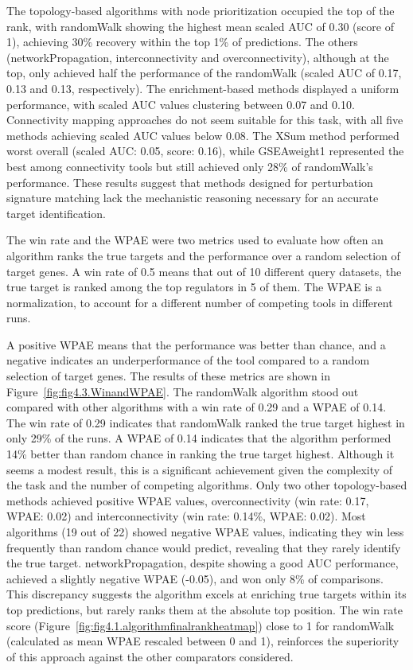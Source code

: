 The topology-based algorithms with node prioritization occupied the top of the rank, with randomWalk showing the highest mean scaled \gls{AUC} of 0.30 (score of 1), achieving 30\% recovery within the top 1\% of predictions.
The others (networkPropagation, interconnectivity and overconnectivity), although at the top, only achieved half the performance of the randomWalk (scaled \gls{AUC} of 0.17, 0.13 and 0.13, respectively).
The enrichment-based methods displayed a uniform performance, with scaled \gls{AUC} values clustering between 0.07 and 0.10.
Connectivity mapping approaches do not seem suitable for this task, with all five methods achieving scaled \gls{AUC} values below 0.08.
The XSum method performed worst overall (scaled \gls{AUC}: 0.05, score: 0.16), while GSEAweight1 represented the best among connectivity tools but still achieved only 28\% of randomWalk's performance.
These results suggest that methods designed for perturbation signature matching lack the mechanistic reasoning necessary for an accurate target identification.

The win rate and the \gls{WPAE} were two metrics used to evaluate how often an algorithm ranks the true targets and the performance over a random selection of target genes.
A win rate of 0.5 means that out of 10 different query datasets, the true target is ranked among the top regulators in 5 of them.
The \gls{WPAE} is a normalization, to account for a different number of competing tools in different runs.

A positive \gls{WPAE} means that the performance was better than chance, and a negative indicates an underperformance of the tool compared to a random selection of target genes.
The results of these metrics are shown in Figure~\ref{fig:fig4.3.WinandWPAE}.
The randomWalk algorithm stood out compared with other algorithms with a win rate of 0.29 and a \gls{WPAE} of 0.14.
The win rate of 0.29 indicates that randomWalk ranked the true target highest in only 29\% of the runs.
A \gls{WPAE} of 0.14 indicates that the algorithm performed 14\% better than random chance in ranking the true target highest.
Although it seems a modest result, this is a significant achievement given the complexity of the task and the number of competing algorithms.
Only two other topology-based methods achieved positive WPAE values, overconnectivity (win rate: 0.17, WPAE: 0.02) and interconnectivity (win rate: 0.14\%, \gls{WPAE}: 0.02).
Most algorithms (19 out of 22) showed negative \gls{WPAE} values, indicating they win less frequently than random chance would predict, revealing that they rarely identify the true target.
networkPropagation, despite showing a good \gls{AUC} performance, achieved a slightly negative \gls{WPAE} (-0.05), and won only 8\% of comparisons.
This discrepancy suggests the algorithm excels at enriching true targets within its top predictions, but rarely ranks them at the absolute top position.
The win rate score (Figure~\ref{fig:fig4.1.algorithmfinalrankheatmap}) close to 1 for randomWalk (calculated as mean \gls{WPAE} rescaled between 0 and 1), reinforces the superiority of this approach against the other comparators considered.

